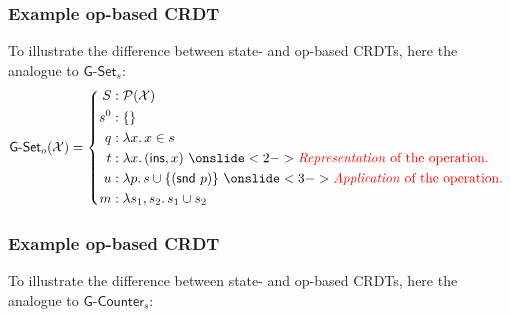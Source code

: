 \documentclass[aspectratio=169,compress,handout]{beamer}
\newcommand*{\CRDT}{\textsf{CRDT}\xspace}
\newcommand*{\CRDTs}{\textsf{CRDTs}\xspace}
\begin{document}
  \begin{frame}
    \frametitle{Example op-based \CRDT}

    To illustrate the difference between state- and op-based \CRDTs, here the
    analogue to $\textsf{G-Set}_s$:
    \[
      \textsf{G-Set}_o(\mathcal{X}) = \left\{\begin{aligned}
        S &: \mathcal{P}(\mathcal{X}) \\
        s^0 &: \{ \} \\
        q &: \lambda x.\, x \in s \\
        t &: \lambda x.\, (\textsf{ins}, x)~\onslide<2->{\text{%
          \color{red}
          \emph{Representation} of the operation.
        }} \\
        u &: \lambda p.\, s \cup \{(\textsf{snd}~p)\}~\onslide<3->{\text{%
          \color{red}
          \emph{Application} of the operation.
        }} \\
        m &: \lambda s_1, s_2.\, s_1 \cup s_2 \\
      \end{aligned}\right.
    \]
  \end{frame}

  \begin{frame}
    \frametitle{Example op-based \CRDT}

    To illustrate the difference between state- and op-based \CRDTs, here the
    analogue to $\textsf{G-Counter}_s$:
    \begin{columns}
      \begin{column}{.5\textwidth}
      \end{column}
      \begin{column}{.5\textwidth}
      \end{column}
    \end{columns}
  \end{frame}
\end{document}
